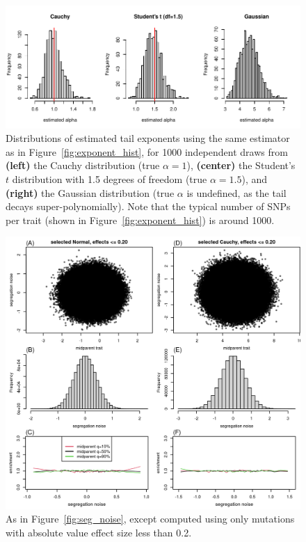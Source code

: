 \documentclass{article}
\newcommand{\1}{\mathbbm{1}}
\theoremstyle{remark}
\theoremstyle{definition}
\newif\ifsubmission
\begin{document}
\begin{figure}
    \begin{center}
        \includegraphics{snp_effects/power_demo}
    \end{center}
    \caption{
        Distributions of estimated tail exponents using the same estimator
        as in Figure~\ref{fig:exponent_hist},
        for 1000 independent draws from
        \textbf{(left)} the Cauchy distribution (true $\alpha=1$),
        \textbf{(center)} the Student's $t$ distribution with 1.5 degrees of freedom (true $\alpha=1.5$), and
        \textbf{(right)} the Gaussian distribution (true $\alpha$ is undefined,
        as the tail decays super-polynomially).
        Note that the typical number of SNPs per trait (shown in Figure~\ref{fig:exponent_hist})
        is around 1000.
        \label{fig:power}
    }
\end{figure}

\begin{figure}
    \begin{center}
        \includegraphics{sims/selected_seg_noise_small}
    \end{center}
    \caption{
        As in Figure~\ref{fig:seg_noise},
        except computed using only mutations with absolute value effect size less than 0.2.
        \label{fig:sel_seg_noise_small}
    }
\end{figure}


\end{document}
